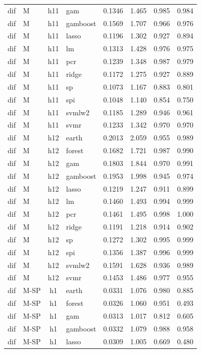 \begin{ThreePartTable}
\begin{longtable}[t]{llclcccc}
dif & M & h11 & gam & 0.1346 & 1.465 & 0.985 & 0.984\\
dif & M & h11 & gamboost & 0.1569 & 1.707 & 0.966 & 0.976\\
dif & M & h11 & lasso & 0.1196 & 1.302 & 0.927 & 0.894\\
dif & M & h11 & lm & 0.1313 & 1.428 & 0.976 & 0.975\\
dif & M & h11 & pcr & 0.1239 & 1.348 & 0.987 & 0.979\\
dif & M & h11 & ridge & 0.1172 & 1.275 & 0.927 & 0.889\\
dif & M & h11 & sp & 0.1073 & 1.167 & 0.883 & 0.801\\
dif & M & h11 & spi & 0.1048 & 1.140 & 0.854 & 0.750\\
dif & M & h11 & svmlw2 & 0.1185 & 1.289 & 0.946 & 0.961\\
dif & M & h11 & svmr & 0.1233 & 1.342 & 0.970 & 0.970\\
\addlinespace
dif & M & h12 & earth & 0.2013 & 2.059 & 0.955 & 0.989\\
dif & M & h12 & forest & 0.1682 & 1.721 & 0.987 & 0.990\\
dif & M & h12 & gam & 0.1803 & 1.844 & 0.970 & 0.991\\
dif & M & h12 & gamboost & 0.1953 & 1.998 & 0.945 & 0.974\\
dif & M & h12 & lasso & 0.1219 & 1.247 & 0.911 & 0.899\\
dif & M & h12 & lm & 0.1460 & 1.493 & 0.994 & 0.999\\
dif & M & h12 & pcr & 0.1461 & 1.495 & 0.998 & 1.000\\
dif & M & h12 & ridge & 0.1191 & 1.218 & 0.914 & 0.902\\
dif & M & h12 & sp & 0.1272 & 1.302 & 0.995 & 0.999\\
dif & M & h12 & spi & 0.1356 & 1.387 & 0.996 & 0.999\\
dif & M & h12 & svmlw2 & 0.1591 & 1.628 & 0.936 & 0.989\\
dif & M & h12 & svmr & 0.1453 & 1.486 & 0.977 & 0.955\\
\addlinespace
dif & M-SP & h1 & earth & 0.0331 & 1.076 & 0.980 & 0.885\\
dif & M-SP & h1 & forest & 0.0326 & 1.060 & 0.951 & 0.493\\
dif & M-SP & h1 & gam & 0.0313 & 1.017 & 0.812 & 0.605\\
dif & M-SP & h1 & gamboost & 0.0332 & 1.079 & 0.988 & 0.958\\
dif & M-SP & h1 & lasso & 0.0309 & 1.005 & 0.669 & 0.480\\

\end{longtable}
\end{ThreePartTable}

